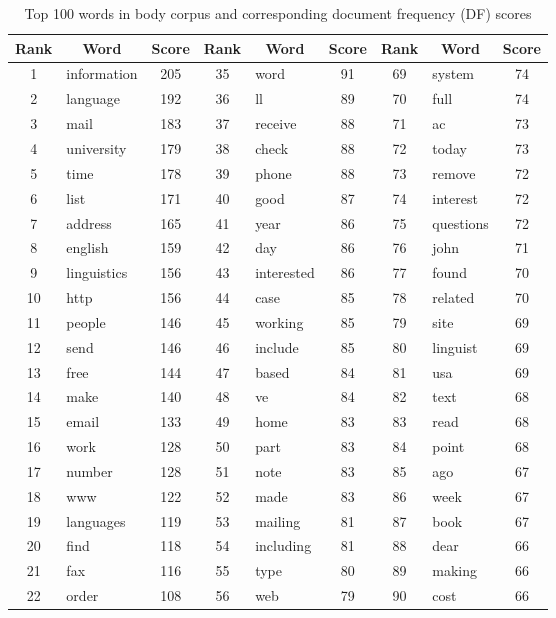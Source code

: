 \documentclass[10pt, a4paper]{article}
\begin{document}
\begin{table}[H]
\caption{Top 100 words in body corpus and corresponding document frequency (DF) scores}\vspace{1em}
\begin{tabular}{|c|l|c||c|l|c||c|l|c|}
\hline
\textbf{Rank} & \multicolumn{1}{c|}{\textbf{Word}} & \textbf{Score}
	& \textbf{Rank} & \multicolumn{1}{c|}{\textbf{Word}} & \textbf{Score}
	& \textbf{Rank} & \multicolumn{1}{c|}{\textbf{Word}} & \textbf{Score}\\
\hline\hline
1 & information & 205 & 35 & word & 91 & 69 & system & 74 \\
2 & language & 192 & 36 & ll & 89 & 70 & full & 74 \\
3 & mail & 183 & 37 & receive & 88 & 71 & ac & 73 \\
4 & university & 179 & 38 & check & 88 & 72 & today & 73 \\
5 & time & 178 & 39 & phone & 88 & 73 & remove & 72 \\
6 & list & 171 & 40 & good & 87 & 74 & interest & 72 \\
7 & address & 165 & 41 & year & 86 & 75 & questions & 72 \\
8 & english & 159 & 42 & day & 86 & 76 & john & 71 \\
9 & linguistics & 156 & 43 & interested & 86 & 77 & found & 70 \\
10 & http & 156 & 44 & case & 85 & 78 & related & 70 \\
11 & people & 146 & 45 & working & 85 & 79 & site & 69 \\
12 & send & 146 & 46 & include & 85 & 80 & linguist & 69 \\
13 & free & 144 & 47 & based & 84 & 81 & usa & 69 \\
14 & make & 140 & 48 & ve & 84 & 82 & text & 68 \\
15 & email & 133 & 49 & home & 83 & 83 & read & 68 \\
16 & work & 128 & 50 & part & 83 & 84 & point & 68 \\
17 & number & 128 & 51 & note & 83 & 85 & ago & 67 \\
18 & www & 122 & 52 & made & 83 & 86 & week & 67 \\
19 & languages & 119 & 53 & mailing & 81 & 87 & book & 67 \\
20 & find & 118 & 54 & including & 81 & 88 & dear & 66 \\
21 & fax & 116 & 55 & type & 80 & 89 & making & 66 \\
22 & order & 108 & 56 & web & 79 & 90 & cost & 66 \\

\end{tabular}
\end{table}
\end{document}

